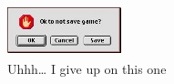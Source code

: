 \documentclass[pdf]{beamer}
\begin{document}
\begin{frame}
\begin{columns}[t]
\begin{figure}[H]
\end{figure}
\begin{figure}[H]
	\begin{flushleft}
    \ \\
	\includegraphics[width=3.3cm,height=1.5cm]{32_ok.png}
    \ \\ \vspace{5mm}  Uhhh… I give up on this one 
    \end{flushleft}
\end{figure}
\end{columns}   
\end{frame}
 
 
 
\end{document}

